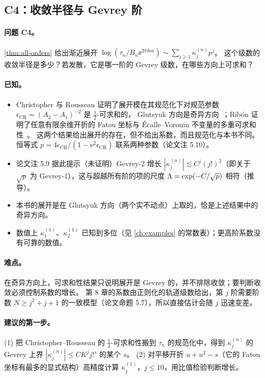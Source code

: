 \subsection{C4：收敛半径与 Gevrey 阶}\label{ch12:sec:C4}

\paragraph{问题 C4。}\cref{thm:all-orders} 给出渐近展开 $\log(\tau_n/B_n\ee^{2\pi\ii na})\sim\sum_{j\ge1}\kappa^{(n)}_jp^j$。
这个级数的收敛半径是多少？若发散，它是哪一阶的 Gevrey 级数，在哪些方向上可求和？

\paragraph{已知。}
\begin{itemize}
\item Christopher 与 Rousseau 证明了展开模在其规范化下对规范参数 $\epsilon_{\mathrm{CR}}=(A_2-A_1)^{-2}$ 是 $\tfrac12$-可求和的，
  Glutsyuk 方向是奇异方向~\cite[推论~4.9]{ChristopherRousseau}；Ribón 证明了任意有限余维开折的 Fatou 坐标与 Écalle--Voronin 不变量的多重可求和性~\cite{Ribon2010}。
  这两个结果给出展开的存在，但不给出系数，而且规范化与本书不同。恒等式 $p=4\epsilon_{\mathrm{CR}}/(1-\nu^2\epsilon_{\mathrm{CR}})$ 联系两种参数（论文注 5.10）。
\item 论文注 5.9 据此提示（未证明）Gevrey-2 增长 $|\kappa^{(n)}_j|\lesssim C^j(j!)^2$（即关于 $\sqrt p$ 为 Gevrey-1），这与超越所有阶的项的尺度 $\Lambda=\exp(-C/\sqrt p)$ 相符（推导）。
\item 本书的展开是在 Glutsyuk 方向（两个实不动点）上取的，恰是上述结果中的奇异方向。
\item 数值上 $\kappa^{(1)}_1$、$\kappa^{(1)}_2$ 已知到多位（见 \cref{ch:examples} 的常数表）；更高阶系数没有可靠的数值。
\end{itemize}

\paragraph{难点。}在奇异方向上，可求和性结果只说明展开是 Gevrey 的，并不排除收敛；要判断收敛必须控制系数的增长。
第 8 章的系数由正则化的轨道级数给出，第 $j$ 阶需要阶数 $N\ge j^2+j+1$ 的一致模型（论文命题 5.7），所以直接估计会随 $j$ 迅速变差。

\paragraph{建议的第一步。}(1) 把 Christopher--Rousseau 的 $\tfrac12$-可求和性搬到 $\tau_n$ 的规范化中，得到 $\kappa^{(n)}_j$ 的 Gevrey 上界 $|\kappa^{(n)}_j|\le CK^jj!^{s}$ 的某个 $s$。
(2) 对平移开折 $u+u^2-s$（它的 Fatou 坐标有最多的显式结构）高精度计算 $\kappa^{(1)}_j$，$j\le10$，用比值检验判断增长。

